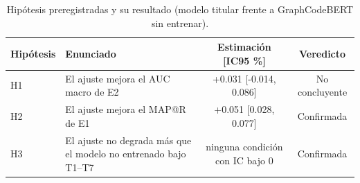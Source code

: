 \begin{table}[H]
\centering
\small
\begin{tabular}{|l|p{5.2cm}|c|c|}
\hline
\textbf{Hipótesis} & \textbf{Enunciado} & \textbf{Estimación [IC95 \%]} & \textbf{Veredicto} \\ \hline
H1 & El ajuste mejora el AUC macro de E2 & +0.031 [-0.014, 0.086] & No concluyente \\ \hline
H2 & El ajuste mejora el MAP@R de E1 & +0.051 [0.028, 0.077] & Confirmada \\ \hline
H3 & El ajuste no degrada más que el modelo no entrenado bajo T1--T7 & ninguna condición con IC bajo 0 & Confirmada \\ \hline
\end{tabular}
\caption{Hipótesis preregistradas y su resultado (modelo titular frente a GraphCodeBERT sin entrenar).}
\label{tab:veredictos}
\end{table}
